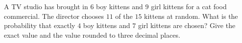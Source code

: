 A TV studio has brought in $6$ boy kittens and $9$ girl kittens for a cat food commercial. The director chooses $11$ of the $15$ kittens at random. What is the probability that exactly $4$ boy kittens and $7$ girl kittens are chosen? Give the exact value and the value rounded to three decimal places.
